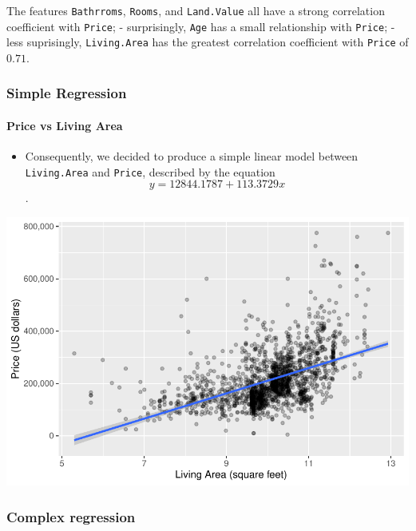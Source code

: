 \documentclass[letterpaper,9pt,twocolumn,twoside,]{pinp}
\providecommand{\tightlist}{%
  \setlength{\itemsep}{0pt}\setlength{\parskip}{0pt}}
\begin{document}
The features \texttt{Bathrroms}, \texttt{Rooms}, and \texttt{Land.Value}
all have a strong correlation coefficient with \texttt{Price}; -
surprisingly, \texttt{Age} has a small relationship with \texttt{Price};
- less suprisingly, \texttt{Living.Area} has the greatest correlation
coefficient with \texttt{Price} of \(0.71\).

\hypertarget{simple-regression}{%
\subsubsection{Simple Regression}\label{simple-regression}}

\hypertarget{price-vs-living-area}{%
\paragraph{Price vs Living Area}\label{price-vs-living-area}}

\begin{itemize}
\tightlist
\item
  Consequently, we decided to produce a simple linear model between
  \texttt{Living.Area} and \texttt{Price}, described by the equation
  \[y = 12844.1787 + 113.3729 x\].
\end{itemize}

\begin{center}\includegraphics{Final-Report_files/figure-latex/unnamed-chunk-6-1} \end{center}

\hypertarget{complex-regression}{%
\subsubsection{Complex regression}\label{complex-regression}}
\end{document}

